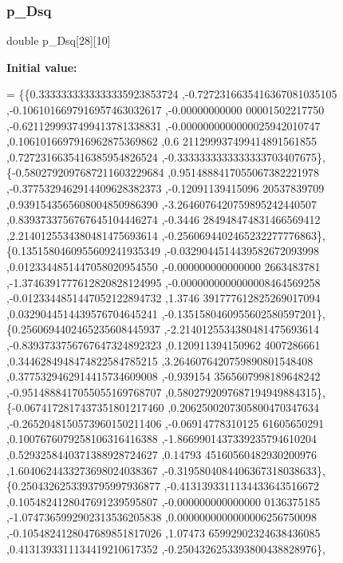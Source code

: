 \mbox{\label{a00993_a622d38ee148e272e08159c8c6bdd383c}} 
\subsubsection{\texorpdfstring{p\+\_\+\+Dsq}{p\_Dsq}}
{\footnotesize\ttfamily double p\+\_\+\+Dsq\mbox{[}28\mbox{]}\mbox{[}10\mbox{]}}

{\bfseries Initial value\+:}
\begin{DoxyCode}
= \{\{0.3333333333333335923853724 ,-0.7272316635416367081035105 ,-0.1061016697916957463032617 ,-0.00000000000
      00001502217750 ,-0.6211299937499413781338831 ,-0.0000000000000025942010747 ,0.1061016697916962875369862 ,0.6
      211299937499414891561855 ,0.7272316635416385954826524 ,-0.3333333333333333703407675\},
\{-0.5802792097687211603229684 ,0.9514888417055067382221978 ,-0.3775329462914409628382373 ,-0.12091139415096
      20537839709 ,0.9391543565608004850986390 ,-3.2646076420759895242440507 ,0.8393733756767645104446274 ,-0.3446
      284948474831466569412 ,2.2140125534380481475693614 ,-0.2560694402465232277776863\},
\{0.1351580460955609241935349 ,-0.0329044514439582672093998 ,0.0123344851447058020954550 ,-0.000000000000000
      2663483781 ,-1.3746391777612820828124995 ,-0.0000000000000008464569258 ,-0.0123344851447052122894732 ,1.3746
      391777612825269017094 ,0.0329044514439576704645241 ,-0.1351580460955602580597201\},
\{0.2560694402465235608445937 ,-2.2140125534380481475693614 ,-0.8393733756767647324892323 ,0.120911394150962
      4007286661 ,0.3446284948474822584785215 ,3.2646076420759890801548408 ,0.3775329462914415734609008 ,-0.939154
      3565607998189648242 ,-0.9514888417055055169768707 ,0.5802792097687194949884315\},
\{-0.0674172817437351801217460 ,0.2062500207305800470347634 ,-0.2652048150573960150211406 ,-0.06914778310125
      61605650291 ,0.1007676079258106316416388 ,-1.8669901437339235794610204 ,0.5293258440371388928724627 ,0.14793
      45160560482930200976 ,1.6040624433273698024038367 ,-0.3195804084406367318038633\},
\{0.2504326253393795997936877 ,-0.4131393311134433643516672 ,0.1054824128047691239595807 ,-0.000000000000000
      0136375185 ,-1.0747365992902313536205838 ,0.0000000000000006256750098 ,-0.1054824128047689851817026 ,1.07473
      65992902324638436085 ,0.4131393311134419210617352 ,-0.2504326253393800438828976\},

\end{DoxyCode}
